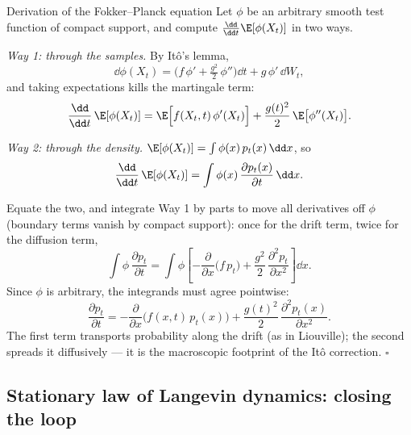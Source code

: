 \begin{toolbox}{Derivation of the Fokker--Planck equation}
Let $\phi$ be an arbitrary smooth test function of compact support, and
compute $\frac{\dd}{\dd t}\E[\phi(X_t)]$ in two ways.

\emph{Way 1: through the samples.} By It\^o's lemma,
\begin{equation*}
  \dd \phi(X_t)
  = \Big( f\,\phi' + \tfrac{g^2}{2}\,\phi'' \Big)\dd t
  + g\,\phi'\,\dd W_t ,
\end{equation*}
and taking expectations kills the martingale term:
\begin{equation*}
  \frac{\dd}{\dd t}\,\E[\phi(X_t)]
  = \E\Big[ f(X_t,t)\,\phi'(X_t) \Big]
  + \frac{g(t)^2}{2}\, \E\big[ \phi''(X_t) \big] .
\end{equation*}

\emph{Way 2: through the density.} $\E[\phi(X_t)] = \int \phi(x)\,
p_t(x)\,\dd x$, so
\begin{equation*}
  \frac{\dd}{\dd t}\,\E[\phi(X_t)]
  = \int \phi(x)\, \frac{\partial p_t(x)}{\partial t}\, \dd x .
\end{equation*}

Equate the two, and integrate Way 1 by parts to move all derivatives off
$\phi$ (boundary terms vanish by compact support): once for the drift term,
twice for the diffusion term,
\begin{equation*}
  \int \phi\, \frac{\partial p_t}{\partial t}
  = \int \phi \left[
      -\frac{\partial}{\partial x}\big( f\, p_t \big)
      + \frac{g^2}{2}\, \frac{\partial^2 p_t}{\partial x^2}
    \right] \dd x .
\end{equation*}
Since $\phi$ is arbitrary, the integrands must agree pointwise:
\begin{equation*}
  \boxed{\;
  \frac{\partial p_t}{\partial t}
  = -\frac{\partial}{\partial x}\big( f(x,t)\, p_t(x) \big)
  + \frac{g(t)^2}{2}\, \frac{\partial^2 p_t(x)}{\partial x^2} .
  \;}
\end{equation*}
The first term transports probability along the drift (as in Liouville);
the second spreads it diffusively --- it is the macroscopic footprint of the
It\^o correction. \hfill$\square$
\end{toolbox}

\subsection{Stationary law of Langevin dynamics: closing the loop}

